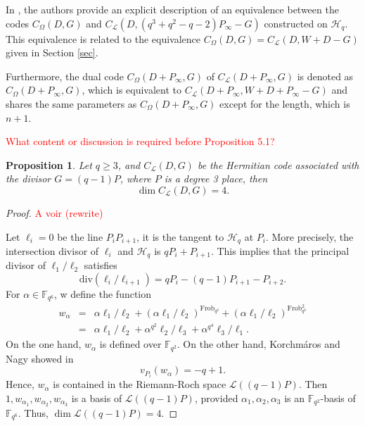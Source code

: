 \documentclass[a4paper]{amsart}
\theoremstyle{plain}
\newtheorem{proposition}[theorem]{Proposition}
\theoremstyle{definition}
\theoremstyle{remark}
\begin{document}
In \cite[Proposition 2.2]{korchmaros2013hermitian}, the authors provide an explicit description of an equivalence between the codes $C_{\Omega}(D,G)$ and $C_{\mathcal{L}}(D,(q^3+q^2-q-2)P_{\infty}-G)$ constructed on $\mathscr{H}_q$. This equivalence is related to the equivalence $C_{\Omega}(D,G)= C_{\mathcal{L}}(D,W + D - G)$ given in Section \ref{sec}.

Furthermore, the dual code $C_{\Omega}(D+P_{\infty},G)$ of $C_{\mathcal{L}}(D+P_{\infty},G)$ is denoted as $C_{\Omega}(D+P_{\infty},G)$, which is equivalent to $C_{\mathcal{L}}(D+P_{\infty},W + D+ P_{\infty} - G)$ and shares the same parameters as $C_{\Omega}(D+P_{\infty},G)$ except for the length, which is $n+1$.

\textcolor{red}{What content or discussion is required before Proposition 5.1?}

\begin{proposition}
	
	Let $q\geq 3$, and $C_{\mathcal{L}}(D,G)$ be the Hermitian code associated with the divisor $G=(q-1)P$, where $P$ is a degree 3 place, then
	\[\dim C_{\mathcal{L}}(D,G)=4.\]
	
\end{proposition}

\begin{proof}
	\textcolor{red}{A voir (rewrite)}
	
	Let $\ell_i=0$ be the line $P_iP_{i+1}$, it is the tangent to $\mathscr{H}_q$ at $P_i$. More precisely, the intersection divisor of $\ell_i$ and $\mathscr{H}_q$ is $qP_i+P_{i+1}$. This implies that the principal divisor of $\ell_1/\ell_2$ satisfies
	\[\mathrm{div}(\ell_i/\ell_{i+1})=qP_i-(q-1)P_{i+1}-P_{i+2}.\]
	For $\alpha \in \mathbb{F}_{q^6}$, w define the function
	\begin{eqnarray*}
		w_\alpha&=&\alpha\ell_1/\ell_2+(\alpha\ell_1/\ell_2)^{\mathrm{Frob}_{q^2}}+(\alpha\ell_1/\ell_2)^{\mathrm{Frob}_{q^2}^2}\\
		&=&\alpha\ell_1/\ell_2+\alpha^{q^2}\ell_2/\ell_3+\alpha^{q^4}\ell_3/\ell_1.
	\end{eqnarray*}
	On the one hand, $w_\alpha$ is defined over $\mathbb{F}_{q^2}$. On the other hand, Korchm\'aros and Nagy showed in \cite[Theorem ~3.1]{korchmaros2013hermitian}
	\[v_{P_i}(w_\alpha)=-q+1.\]
	Hence, $w_\alpha$ is contained in the Riemann-Roch space $\mathcal{L}((q-1)P)$. Then $1,w_{\alpha_1}, w_{\alpha_2}, w_{\alpha_3}$ is a basis of $\mathcal{L}((q-1)P)$, provided $\alpha_1,\alpha_2,\alpha_3$ is an $\mathbb{F}_{q^2}$-basis of $\mathbb{F}_{q^6}$. Thus, $\dim\mathcal{L}((q-1)P)=4$.
\end{proof}
\end{document}
